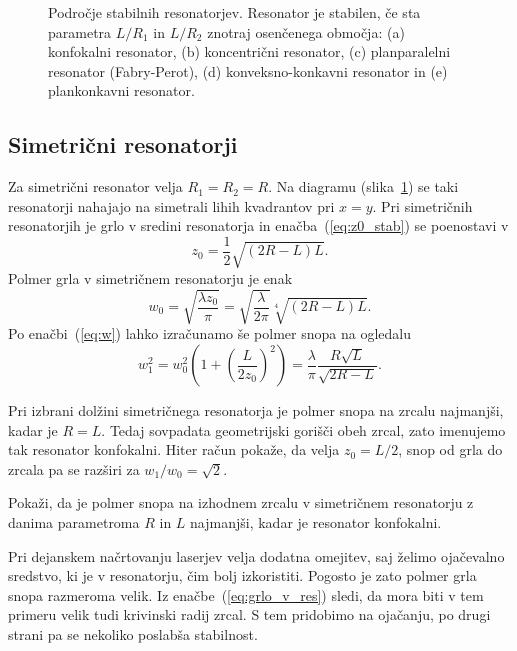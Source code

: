\begin{figure}[h]
\centering
\def\svgwidth{100truemm} 

\caption{Področje stabilnih resonatorjev. Resonator je stabilen, 
če sta parametra $L/R_{1}$ in $L/R_{2}$ znotraj osenčenega območja: 
(a) konfokalni resonator,
(b) koncentrični resonator, 
(c) planparalelni resonator (Fabry-Perot), 
(d) konveksno-konkavni resonator 
in (e) plankonkavni resonator.}
\label{fig:Podrocje-stabilnih-resonatorjev}
\end{figure}

\subsection*{Simetrični resonatorji}
Za simetrični resonator velja $R_{1}=R_{2}=R$. Na diagramu 
(slika~\ref{fig:Podrocje-stabilnih-resonatorjev}) 
se taki resonatorji nahajajo na simetrali lihih kvadrantov pri $x=y$. Pri simetričnih resonatorjih 
je grlo v sredini resonatorja in enačba~(\ref{eq:z0_stab}) se poenostavi v 
\begin{equation}
z_{0}=\frac{1}{2}\sqrt{(2R-L)L}.
\label{eq:zosim}
\end{equation}
Polmer grla v simetričnem resonatorju je enak
\begin{equation}
w_{0}=\sqrt{\frac{\lambda z_{0}}{\pi}}=\sqrt{\frac{\lambda}{2\pi}}\sqrt[4]{(2R-L)L}.
\label{eq:grlo_v_res}
\end{equation}
Po enačbi~(\ref{eq:w}) lahko izračunamo še polmer snopa na ogledalu
\begin{equation}
w_{1}^{2}=w_{0}^{2}\left(1+\left(\frac{L}{2z_{0}}\right)^{2}\right)=
\frac{\lambda}{\pi}\frac{R\sqrt{L}}{\sqrt{2R-L}}.
\end{equation}

Pri izbrani dolžini simetričnega resonatorja je polmer snopa na zrcalu najmanjši,
kadar je $R=L$. Tedaj sovpadata geometrijski gorišči obeh zrcal,
zato imenujemo tak resonator konfokalni. 
Hiter račun pokaže, da velja $z_{0}=L/2$, snop od grla do zrcala pa se razširi
za $w_1/w_0=\sqrt{2}$. 
\begin{definition}
\label{naloga:uklon_konf}
 Pokaži, da je polmer snopa na izhodnem zrcalu v simetričnem resonatorju z
 danima parametroma $R$ in $L$ najmanjši, kadar je resonator konfokalni.
\end{definition}

Pri dejanskem načrtovanju laserjev velja dodatna omejitev, saj želimo 
ojačevalno sredstvo, ki je v resonatorju, čim bolj izkoristiti. Pogosto je zato 
polmer grla snopa razmeroma velik. Iz enačbe~(\ref{eq:grlo_v_res})
sledi, da mora biti v tem primeru velik tudi krivinski radij zrcal. S tem
pridobimo na ojačanju, po drugi strani pa se nekoliko poslabša stabilnost.

